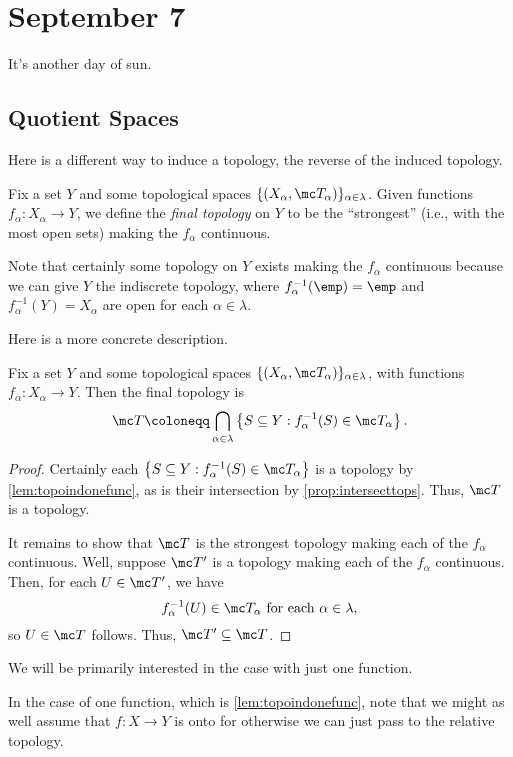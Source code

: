 \documentclass[../notes.tex]{subfiles}
\begin{document}
\section{September 7}

It's another day of sun.

\subsection{Quotient Spaces}
Here is a different way to induce a topology, the reverse of the induced topology.
\begin{definition}
	Fix a set $Y$ and some topological spaces $\{(X_\alpha,\mc T_\alpha)\}_{\alpha\in\lambda}$. Given functions $f_\alpha\colon X_\alpha\to Y$, we define the \textit{final topology} on $Y$ to be the ``strongest'' (i.e., with the most open sets) making the $f_\alpha$ continuous.
\end{definition}
\begin{remark}
	Note that certainly some topology on $Y$ exists making the $f_\alpha$ continuous because we can give $Y$ the indiscrete topology, where $f_\alpha^{-1}(\emp)=\emp$ and $f_\alpha^{-1}(Y)=X_\alpha$ are open for each $\alpha\in\lambda$.
\end{remark}
Here is a more concrete description.
\begin{lemma}
	Fix a set $Y$ and some topological spaces $\{(X_\alpha,\mc T_\alpha)\}_{\alpha\in\lambda}$, with functions $f_\alpha\colon X_\alpha\to Y$. Then the final topology is
	\[\mc T\coloneqq\bigcap_{\alpha\in\lambda}\left\{S\subseteq Y:f^{-1}_\alpha(S)\in\mc T_\alpha\right\}.\]
\end{lemma}
\begin{proof}
	Certainly each $\left\{S\subseteq Y:f^{-1}_\alpha(S)\in\mc T_\alpha\right\}$ is a topology by \autoref{lem:topoindonefunc}, as is their intersection by \autoref{prop:intersecttops}. Thus, $\mc T$ is a topology.
	
	It remains to show that $\mc T$ is the strongest topology making each of the $f_\alpha$ continuous. Well, suppose $\mc T'$ is a topology making each of the $f_\alpha$ continuous. Then, for each $U\in\mc T'$, we have
	\[f_\alpha^{-1}(U)\in\mc T_\alpha\text{ for each }\alpha\in\lambda,\]
	so $U\in\mc T$ follows. Thus, $\mc T'\subseteq\mc T$.
\end{proof}
We will be primarily interested in the case with just one function.
\begin{remark}
	In the case of one function, which is \autoref{lem:topoindonefunc}, note that we might as well assume that $f\colon X\to Y$ is onto for otherwise we can just pass to the relative topology.
\end{remark}
\end{document}

